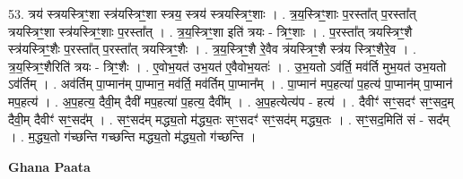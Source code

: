\documentclass[17pt]{extarticle}
\begin{document}
53. त्रय॑ स्त्रयस्त्रिꣳ॒॒शा स्त्र॑यस्त्रिꣳ॒॒शा स्त्रय॒ स्त्रय॑ स्त्रयस्त्रिꣳ॒॒शाः । . त्र॒य॒स्त्रिꣳ॒॒शाः प॒रस्ता᳚त् प॒रस्ता᳚त् त्रयस्त्रिꣳ॒॒शा स्त्र॑यस्त्रिꣳ॒॒शाः प॒रस्ता᳚त् । . त्र॒य॒स्त्रिꣳ॒॒शा इति॑ त्रयः - त्रिꣳ॒॒शाः । . प॒रस्ता᳚त् त्रयस्त्रिꣳ॒॒शै स्त्र॑यस्त्रिꣳ॒॒शैः प॒रस्ता᳚त् प॒रस्ता᳚त् त्रयस्त्रिꣳ॒॒शैः । . त्र॒य॒स्त्रिꣳ॒॒शै रे॒वैव त्र॑यस्त्रिꣳ॒॒शै स्त्र॑य स्त्रिꣳ॒॒शैरे॒व । . त्र॒य॒स्त्रिꣳ॒॒शैरिति॑ त्रयः - त्रिꣳ॒॒शैः । . ए॒वोभ॒यत॑ उभ॒यत॑ ए॒वैवोभ॒यतः॑ । . उ॒भ॒यतो ऽव॑र्ति॒ मव॑र्ति मुभ॒यत॑ उभ॒यतो ऽव॑र्तिम् । . अव॑र्तिम् पा॒प्मान॑म् पा॒प्मान॒ मव॑र्ति॒ मव॑र्तिम् पा॒प्मान᳚म् । . पा॒प्मान॑ मप॒हत्या॑ प॒हत्य॑ पा॒प्मान॑म् पा॒प्मान॑ मप॒हत्य॑ । . अ॒प॒हत्य॒ दैवी॒म् दैवी॑ मप॒हत्या॑ प॒हत्य॒ दैवी᳚म् । . अ॒प॒हत्येत्य॑प - हत्य॑ । . दैवीꣳ॑ सꣳ॒॒सदꣳ॑ सꣳ॒॒सद॒म् दैवी॒म् दैवीꣳ॑ सꣳ॒॒सद᳚म् । . सꣳ॒॒सद॑म् मद्ध्य॒तो म॑द्ध्य॒तः सꣳ॒॒सदꣳ॑ सꣳ॒॒सद॑म् मद्ध्य॒तः । . सꣳ॒॒सद॒मिति॑ सं - सद᳚म् । . म॒द्ध्य॒तो ग॑च्छन्ति गच्छन्ति मद्ध्य॒तो म॑द्ध्य॒तो ग॑च्छन्ति । \newline

\textbf{Ghana Paata } \newline
\end{document}
